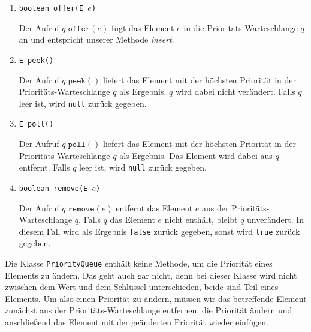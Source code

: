 \begin{enumerate}
\item \texttt{boolean offer(E $e$)}

      Der Aufruf $q.\mathtt{offer}(e)$ f\"ugt das Element $e$ in die
      Priorit\"ats-Warteschlange $q$ an und
      entspricht unserer Methode \textsl{insert}. 
\item \texttt{E peek()}

      Der Aufruf $q.\mathtt{peek}()$ liefert das Element mit der h\"ochsten Priorit\"at in der
      Priorit\"ats-Warte\-schlange $q$ als Ergebnis.   $q$ wird dabei nicht ver\"andert.  Falls $q$
      leer ist, wird \texttt{null} zur\"uck gegeben.
\item \texttt{E poll()}

      Der Aufruf $q.\mathtt{poll}()$ liefert das Element mit der h\"ochsten Priorit\"at in der
      Priorit\"ats-Warte\-schlange $q$ als Ergebnis.  
      Das Element wird dabei aus $q$ entfernt.  Falls $q$
      leer ist, wird \texttt{null} zur\"uck gegeben.
\item \texttt{boolean remove(E $e$)}

      Der Aufruf $q.\mathtt{remove}(e)$ entfernt das Element $e$ aus
      der Priorit\"ats-Warteschlange $q$.  Falls $q$ das Element $e$ nicht enth\"alt, bleibt
      $q$ unver\"andert.  In diesem Fall wird als Ergebnis \texttt{false} zur\"uck gegeben,
      sonst wird \texttt{true} zur\"uck gegeben.
\end{enumerate}
Die Klasse \texttt{PriorityQueue} enth\"alt keine Methode, um die Priorit\"at eines Elements
zu \"andern.  Das geht auch gar nicht, denn bei dieser Klasse wird nicht zwischen dem Wert
und dem Schl\"ussel unterschieden, beide sind Teil eines Elements.  Um also einen Priorit\"at
zu \"andern, m\"ussen wir das betreffende Element zun\"achst aus der Priorit\"ats-Warteschlange
entfernen, die Priorit\"at \"andern und anschlie{\ss}end das Element mit der ge\"anderten Priorit\"at
wieder einf\"ugen.


%

